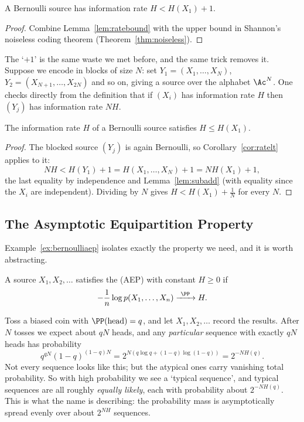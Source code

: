 \begin{corollary}\label{cor:ratelt}
	A Bernoulli source has information rate $H < H(X_1)+1$.
\end{corollary}

\begin{proof}
	Combine Lemma~\ref{lem:ratebound} with the upper bound in Shannon's noiseless coding theorem (Theorem~\ref{thm:noiseless}).
\end{proof}

The `$+1$' is the same waste we met before, and the same trick removes it. Suppose we encode in blocks of size $N$: set $Y_1 = (X_1,\dots,X_N)$, $Y_2 = (X_{N+1},\dots,X_{2N})$ and so on, giving a source over the alphabet $\Ac^N$. One checks directly from the definition that if $(X_i)$ has information rate $H$ then $(Y_j)$ has information rate $NH$.

\begin{proposition}\label{prop:rateleH}
	The information rate $H$ of a Bernoulli source satisfies $H \le H(X_1)$.
\end{proposition}

\begin{proof}
	The blocked source $(Y_j)$ is again Bernoulli, so Corollary~\ref{cor:ratelt} applies to it:
	$$NH < H(Y_1) + 1 = H(X_1,\dots,X_N)+1 = NH(X_1)+1,$$
	the last equality by independence and Lemma~\ref{lem:subadd} (with equality since the $X_i$ are independent). Dividing by $N$ gives $H < H(X_1)+\frac1N$ for every $N$.
\end{proof}

\subsection{The Asymptotic Equipartition Property}

Example~\ref{ex:bernoulliaep} isolates exactly the property we need, and it is worth abstracting.

\begin{definition}[AEP]
	A source $X_1, X_2, \dots$ satisfies the  (AEP) with constant $H \ge 0$ if
	$$-\frac1n\log p(X_1,\dots,X_n) \xrightarrow{\ \PP\ } H.$$
\end{definition}

\begin{example}
	Toss a biased coin with $\PP(\text{head}) = q$, and let $X_1, X_2, \dots$ record the results. After $N$ tosses we expect about $qN$ heads, and any \emph{particular} sequence with exactly $qN$ heads has probability
	$$q^{qN}(1-q)^{(1-q)N} = 2^{N(q\log q + (1-q)\log(1-q))} = 2^{-NH(q)}.$$
	Not every sequence looks like this; but the atypical ones carry vanishing total probability. So with high probability we see a `typical sequence', and typical sequences are all roughly \emph{equally likely}, each with probability about $2^{-NH(q)}$. This is what the name is describing: the probability mass is asymptotically spread evenly over about $2^{NH}$ sequences.
\end{example}

